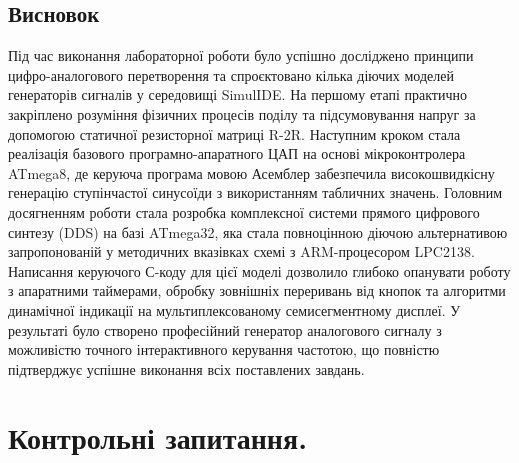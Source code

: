 \documentclass[14pt, a4paper]{extreport}
\begin{document}
	
	\subsection*{Висновок}
	
	Під час виконання лабораторної роботи було успішно досліджено принципи цифро-аналогового перетворення та спроєктовано кілька діючих моделей генераторів сигналів у середовищі SimulIDE. На першому етапі практично закріплено розуміння фізичних процесів поділу та підсумовування напруг за допомогою статичної резисторної матриці R-2R. Наступним кроком стала реалізація базового програмно-апаратного ЦАП на основі мікроконтролера ATmega8, де керуюча програма мовою Асемблер забезпечила високошвидкісну генерацію ступінчастої синусоїди з використанням табличних значень. Головним досягненням роботи стала розробка комплексної системи прямого цифрового синтезу (DDS) на базі ATmega32, яка стала повноцінною діючою альтернативою запропонованій у методичних вказівках схемі з ARM-процесором LPC2138. Написання керуючого С-коду для цієї моделі дозволило глибоко опанувати роботу з апаратними таймерами, обробку зовнішніх переривань від кнопок та алгоритми динамічної індикації на мультиплексованому семисегментному дисплеї. У результаті було створено професійний генератор аналогового сигналу з можливістю точного інтерактивного керування частотою, що повністю підтверджує успішне виконання всіх поставлених завдань.
	
	\section*{Контрольні запитання.}
	
\end{document}

